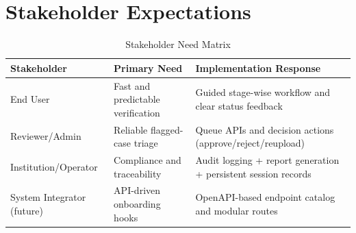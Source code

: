 \section{Stakeholder Expectations}
\begin{longtable}{p{3.2cm}p{4.8cm}p{6.5cm}}
\caption{Stakeholder Need Matrix}\\
\toprule
Stakeholder & Primary Need & Implementation Response \\
\midrule
End User & Fast and predictable verification & Guided stage-wise workflow and clear status feedback \\
Reviewer/Admin & Reliable flagged-case triage & Queue APIs and decision actions (approve/reject/reupload) \\
Institution/Operator & Compliance and traceability & Audit logging + report generation + persistent session records \\
System Integrator (future) & API-driven onboarding hooks & OpenAPI-based endpoint catalog and modular routes \\
\bottomrule
\end{longtable}
